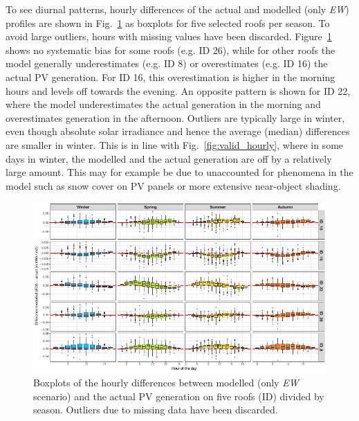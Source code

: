 To see diurnal patterns, hourly differences of the actual and modelled (only \textit{EW}) profiles are shown in Fig.~\ref{fig:valid_boxplots} as boxplots for five selected roofs per season. To avoid large outliers, hours with missing values have been discarded. Figure~\ref{fig:valid_boxplots} shows no systematic bias for some roofs (e.g. ID 26), while for other roofs the model generally underestimates (e.g. ID 8) or overestimates (e.g. ID 16) the actual PV generation. For ID 16, this overestimation is higher in the morning hours and levels off towards the evening. An opposite pattern is shown for ID 22, where the model underestimates the actual generation in the morning and overestimates generation in the afternoon. Outliers are typically large in winter, even though absolute solar irradiance and hence the average (median) differences are smaller in winter. This is in line with Fig.~\ref{fig:valid_hourly}, where in some days in winter, the modelled and the actual generation are off by a relatively large amount. This may for example be due to unaccounted for phenomena in the model such as snow cover on PV panels or more extensive near-object shading. %
\\

\begin{figure}[tb]
\centering\includegraphics[width=\linewidth]{images/Figs/hourly_compare.pdf}
\caption{Boxplots of the hourly differences between modelled (only \textit{EW} scenario) and the actual PV generation on five roofs (ID) divided by season. Outliers due to missing data have been discarded.}
\label{fig:valid_boxplots}
\end{figure}

